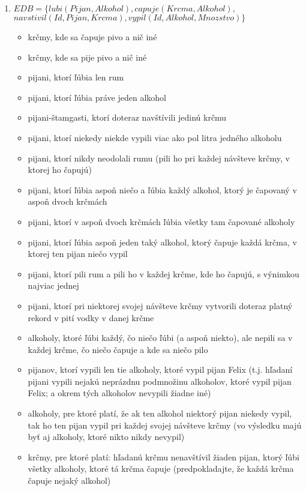 \documentclass[10pt, a4paper]{article}
\theoremstyle{definition}
\begin{document}
\begin{enumerate}
\item $EDB=\{lubi(Pijan, Alkohol), capuje(Krcma, Alkohol),$\\
\hspace*{1cm} $navstivil(Id, Pijan, Krcma), vypil(Id, Alkohol, Mnozstvo)\}$
\begin{itemize}
    \item krčmy, kde sa čapuje pivo a nič iné
    \item krčmy, kde sa pije pivo a nič iné
    \item pijani, ktorí ľúbia len rum
    \item pijani, ktorí ľúbia práve jeden alkohol
    \item pijani-štamgasti, ktorí doteraz navštívili jedinú krčmu
    \item pijani, ktorí niekedy niekde vypili viac ako pol litra jedného alkoholu
    \item pijani, ktorí nikdy neodolali rumu (pili ho pri každej návšteve krčmy, v ktorej ho čapujú)
    \item pijani, ktorí ľúbia aspoň niečo a ľúbia každý alkohol, ktorý je čapovaný v aspoň dvoch krčmách
    \item pijani, ktorí v aspoň dvoch krčmách ľúbia všetky tam čapované alkoholy
    \item pijani, ktorí ľúbia aspoň jeden taký alkohol, ktorý čapuje každá krčma, v ktorej ten pijan niečo vypil
    \item pijani, ktorí pili rum a pili ho v každej krčme, kde ho čapujú, s výnimkou najviac jednej
    \item pijani, ktorí pri niektorej svojej návšteve krčmy vytvorili doteraz platný rekord v pití vodky v danej krčme
    \item alkoholy, ktoré ľúbi každý, čo niečo ľúbi (a aspoň niekto), ale nepili sa v každej krčme, čo niečo čapuje a kde sa niečo pilo
    \item pijanov, ktorí vypili len tie alkoholy, ktoré vypil pijan Felix (t.j. hľadaní pijani vypili nejakú neprázdnu podmnožinu alkoholov,
            ktoré vypil pijan Felix; a okrem tých alkoholov nevypili žiadne iné)
    \item alkoholy, pre ktoré platí, že ak ten alkohol niektorý pijan niekedy vypil, tak ho ten pijan vypil pri každej svojej návšteve krčmy
            (vo výsledku majú byť aj alkoholy, ktoré nikto nikdy nevypil)
    \item krčmy, pre ktoré platí: hľadanú krčmu nenavštívil žiaden pijan, ktorý ľúbi všetky alkoholy, ktoré tá krčma čapuje (predpokladajte, že každá krčma čapuje nejaký alkohol) 

\end{itemize}
\end{enumerate}
\end{document}
